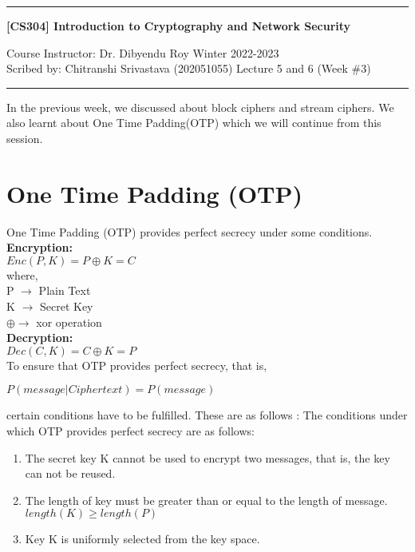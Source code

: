 \documentclass[11pt]{article}
\begin{document}
\noindent
\rule{\textwidth}{1pt}
\begin{center}
{\bf [CS304] Introduction to Cryptography and Network Security}
\end{center}
Course Instructor: Dr. Dibyendu Roy \hfill Winter 2022-2023\\
Scribed by: Chitranshi Srivastava (202051055) \hfill Lecture 5 and 6 (Week \#3)
\\
\rule{\textwidth}{1pt}
In the previous week, we discussed about block ciphers and stream ciphers. We also learnt about One Time Padding(OTP) which we will continue from this session.
\section{One Time Padding (OTP)}
One Time Padding (OTP) provides perfect secrecy under some conditions.\\
\textbf{Encryption: }\\
\vspace{3mm}
$Enc(P, K) = P \oplus K = C$\\
where,\\
 P $\rightarrow$ Plain Text\\
    K $\rightarrow$ Secret Key\\
    $\oplus \rightarrow $ xor operation\\
\vspace{5mm}
\textbf{Decryption: }\\
\vspace{3mm}
    $Dec(C, K) = C \oplus K = P$\\
To ensure that OTP provides perfect secrecy, that is,\\
\begin{center}
    $P(message | Cipher text) = P(message)$
\end{center}
certain conditions have to be fulfilled. These are as follows :
The conditions under which OTP provides perfect secrecy are as follows:
\begin{enumerate}
    \item The secret key K cannot be used to encrypt two messages, that is, the key can not be reused.
    \item The length of key must be greater than or equal to the length of message.\\
    $length(K) \geq length(P)$
    \item Key K is uniformly selected from the key space.
\end{enumerate}
\end{document}
